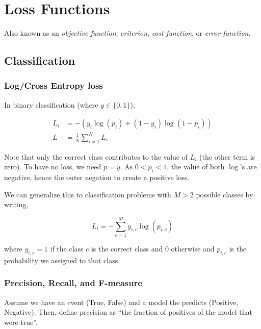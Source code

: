 \documentclass{article}
\begin{document}
\noindent{}

\tableofcontents

\section{Loss Functions}

Also known as an {\em objective function}, {\em criterion}, {\em cost function}, or {\em error function}.

\subsection{Classification}

\subsubsection{Log/Cross Entropy loss}

In binary classification (where $y \in \{ 0, 1 \}$),

\begin{align}
    L_i &= -(y_i \log(p_i) + (1 - y_i) \log(1 - p_i)) \\
    L &= \frac{1}{N} \sum_{i=1}^{N} L_i
\end{align}

\noindent
Note that only the correct class contributes to the value of $L_i$ (the other term is zero). To have no loss, we need $p = y$. As $0 < p_i < 1$, the value of both $\log$'s are negative, hence the outer negation to create a positive loss.

We can generalize this to classification problems with $M > 2$ possible classes by writing,

\begin{equation}
    L_i = - \sum_{c = 1}^{M} y_{i, c} \log(p_{i, c})
\end{equation}

\noindent
where $y_{i, c} = 1$ if the class $c$ is the correct class and $0$ otherwise and $p_{i, c}$ is the probability we assigned to that class.

\subsubsection{Precision, Recall, and F-measure}

Assume we have an event (True, False) and a model the predicts (Positive, Negative). Then, define precision as ``the fraction of positives of the model that were true''.
\end{document}

